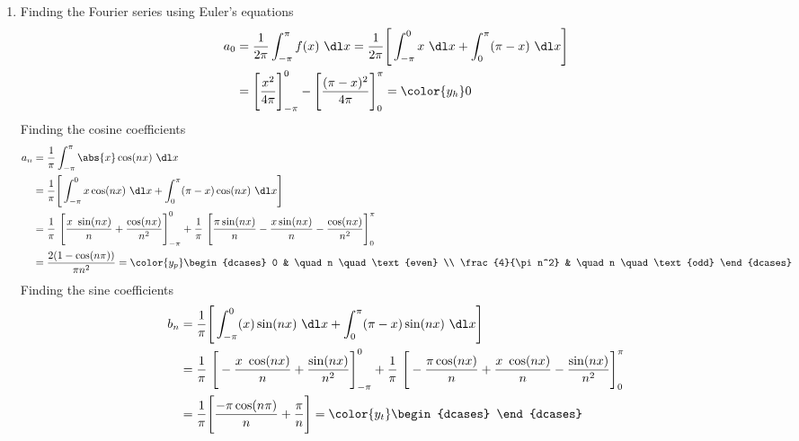 \begin{enumerate}
    \item Finding the Fourier series using Euler's equations
          \begin{align}
              a_0 & = \frac{1}{2\pi} \int_{-\pi}^{\pi} f(x)\ \dl x
              = \frac{1}{2\pi} \Bigg[\int_{-\pi}^{0} x\ \dl x
              +  \int_{0}^{\pi} (\pi - x)\ \dl x\Bigg]             \\
                  & = \Bigg[ \frac{x^2}{4\pi} \Bigg]_{-\pi}^0
              - \Bigg[ \frac{(\pi - x)^2}{4\pi} \Bigg]_0^{\pi}
              = \color{y_h} 0
          \end{align}
          Finding the cosine coefficients
          \begin{align}
              a_n & = \frac{1}{\pi} \int_{-\pi}^{\pi} \abs{x} \cos(nx)\ \dl x \\
                  & = \frac{1}{\pi} \Bigg[\int_{-\pi}^{0} x \cos(nx)\ \dl x
              +  \int_{0}^{\pi} (\pi - x) \cos(nx)\ \dl x\Bigg]               \\
                  & = \frac{1}{\pi}\ \Bigg[ \frac{x\ \sin(nx)}{n}
                  + \frac{\cos(nx)}{n^2} \Bigg]_{-\pi}^{0}
              + \frac{1}{\pi}\ \Bigg[\frac{\pi \sin(nx)}{n} - \frac{x \sin(nx)}{n}
              - \frac{\cos(nx)}{n^2} \Bigg]_0^{\pi}                           \\
                  & = \frac{2(1 - \cos(n\pi))}{\pi n^2}
              = \color{y_p} \begin{dcases}
                                0                 & \quad n \quad \text{even} \\
                                \frac{4}{\pi n^2} & \quad n \quad \text{odd}
                            \end{dcases}
          \end{align}
          Finding the sine coefficients
          \begin{align}
              b_n & = \frac{1}{\pi} \Bigg[\int_{-\pi}^{0} (x) \sin(nx)\ \dl x
              +  \int_{0}^{\pi} (\pi - x) \sin(nx)\ \dl x\Bigg]               \\
                  & = \frac{1}{\pi}\ \Bigg[ -\frac{x\ \cos(nx)}{n}
                  + \frac{\sin(nx)}{n^2} \Bigg]_{-\pi}^{0}
              + \frac{1}{\pi}\ \Bigg[-\frac{\pi \cos(nx)}{n} + \frac{x\ \cos(nx)}{n}
              - \frac{\sin(nx)}{n^2} \Bigg]_{0}^{\pi}                         \\
                  & = \frac{1}{\pi} \Bigg[\frac{-\pi \cos(n\pi)}{n}
                  + \frac{\pi}{n}\Bigg]
              = \color{y_t}  \begin{dcases}

\end{dcases}
\end{align}
\end{enumerate}
